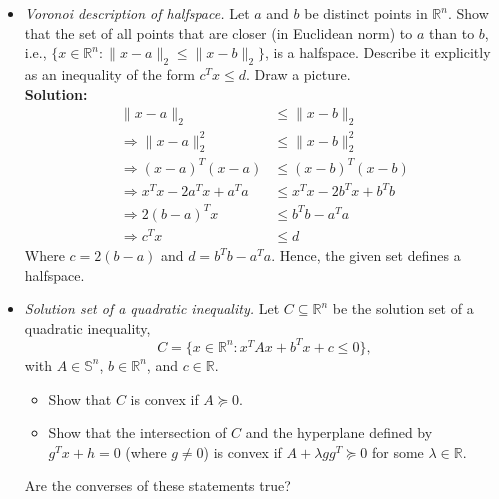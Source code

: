 \documentclass{article}
\begin{document}
\begin{itemize}
  \item[2.7] \textit{Voronoi description of halfspace.} Let $a$ and $b$ be distinct points in $\mathbb{R}^n$. Show that the set of all points that are closer (in Euclidean norm) to $a$ than to $b$, i.e., $\{x \in \mathbb{R}^n : \|x - a\|_2 \leq \|x - b\|_2\}$, is a halfspace. Describe it explicitly as an inequality of the form $c^T x \leq d$. Draw a picture. \\
  
  \textbf{Solution:}
  \begin{align*}
    \|x - a\|_2 &\leq \|x - b\|_2 \\
    \Rightarrow \|x - a\|_2^2 &\leq \|x - b\|_2^2 \\
    \Rightarrow (x - a)^T (x - a) &\leq (x - b)^T (x - b) \\
    \Rightarrow x^T x - 2 a^T x + a^T a &\leq x^T x - 2 b^T x + b^T b \\
    \Rightarrow 2 (b - a)^T x &\leq b^T b - a^T a \\
    \Rightarrow c^T x &\leq d
  \end{align*}
  Where $c = 2 (b - a)$ and $d = b^T b - a^T a$. Hence, the given set defines a halfspace.

  \item[2.10] \textit{Solution set of a quadratic inequality.} Let $C \subseteq \mathbb{R}^n$ be the solution set of a quadratic inequality,
  \[ C = \{x \in \mathbb{R}^n : x^T A x + b^T x + c \leq 0\}, \]
  with $A \in \mathbb{S}^n$, $b \in \mathbb{R}^n$, and $c \in \mathbb{R}$.
  \begin{itemize}
    \item[(a)] Show that $C$ is convex if $A \succeq 0$.
    \item[(b)] Show that the intersection of $C$ and the hyperplane defined by $g^T x + h = 0$ (where $g \neq 0$) is convex if $A + \lambda g g^T \succeq 0$ for some $\lambda \in \mathbb{R}$.
  \end{itemize}
  Are the converses of these statements true? \\


\end{itemize}
\end{document}
